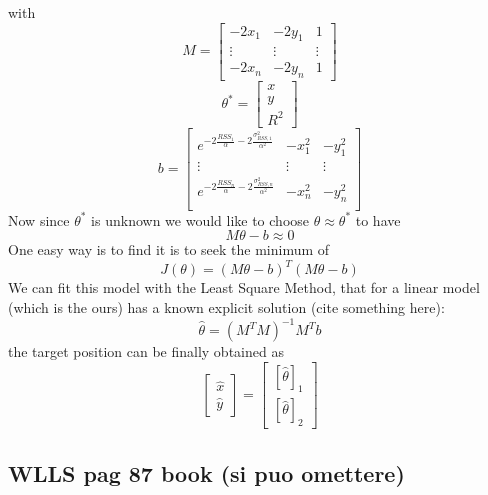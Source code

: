 \documentclass[12pt]{report}
\begin{document}
with $$M=\begin{bmatrix}
        -2x_1 & -2y_1 & 1\\
        \vdots&\vdots&\vdots\\
        -2x_n & -2y_n & 1
    \end{bmatrix}$$
$$\theta^* =     \begin{bmatrix}
        x\\
        y\\
        R^2
    \end{bmatrix}$$
$$b=    \begin{bmatrix}
        e^{-2\frac{RSS_1}{\alpha}-2\frac{\sigma^2_{RSS,1}}{\alpha^2}} & -x_1^2 & -y_1^2\\
        \vdots&\vdots&\vdots\\
        e^{-2\frac{RSS_n}{\alpha}-2\frac{\sigma^2_{RSS,n}}{\alpha^2}} & -x_n^2 & -y_n^2\\
    \end{bmatrix}$$
Now since $\theta^*$ is unknown we would like to choose $\theta\approx\theta^*$ to have 
\begin{equation}
    M\theta-b\approx0
\end{equation}
One easy way is to find it is to seek the minimum of 
\begin{equation}
    J(\theta)=(M\theta - b)^T(M\theta - b)
\end{equation}
We can fit this model with the Least Square Method, that for a linear model (which is the ours) has a known explicit solution (cite something here):
\begin{equation}
    \hat{\theta}=(M^TM)^{-1}M^Tb
\end{equation}
the target position can be finally obtained as 
\begin{equation}
\begin{bmatrix}
    \hat{x}\\
    \hat{y}
\end{bmatrix}=
\begin{bmatrix}
    [\hat{\theta}]_1\\
    [\hat{\theta}]_2
\end{bmatrix}
\end{equation}
\clearpage


\subsection{WLLS pag 87 book (si puo omettere)}
\clearpage
\end{document}
